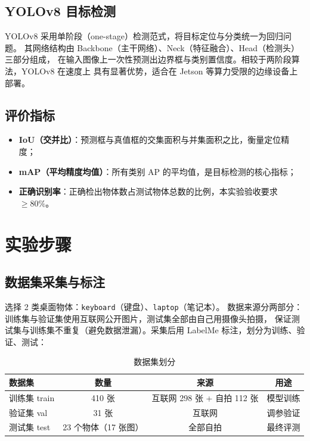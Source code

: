 \documentclass[zihao=-4, a4paper]{ctexart}
\newcommand{\tabhead}[1]{\textbf{\color{white}#1}}
\begin{document}
\subsection{YOLOv8 目标检测}
YOLOv8 采用单阶段（one-stage）检测范式，将目标定位与分类统一为回归问题。
其网络结构由 Backbone（主干网络）、Neck（特征融合）、Head（检测头）三部分组成，
在输入图像上一次性预测出边界框与类别置信度。相较于两阶段算法，YOLOv8 在速度上
具有显著优势，适合在 Jetson 等算力受限的边缘设备上部署。

\subsection{评价指标}
\begin{itemize}[leftmargin=2em]
    \item \textbf{IoU（交并比）}：预测框与真值框的交集面积与并集面积之比，衡量定位精度；
    \item \textbf{mAP（平均精度均值）}：所有类别 AP 的平均值，是目标检测的核心指标；
    \item \textbf{正确识别率}：正确检出物体数占测试物体总数的比例，本实验验收要求 $\geq 80\%$。
\end{itemize}

\section{实验步骤}

\subsection{数据集采集与标注}
选择 2 类桌面物体：\texttt{keyboard}（键盘）、\texttt{laptop}（笔记本）。
数据来源分两部分：训练集与验证集使用互联网公开图片，测试集全部由自己用摄像头拍摄，
保证测试集与训练集不重复（避免数据泄漏）。采集后用 LabelMe 标注，划分为训练、验证、测试：

\begin{table}[H]
    \centering
    \begin{tabular}{@{}lccc@{}}
        \hline
        \rowcolor{primary}
        \tabhead{数据集} & \tabhead{数量} & \tabhead{来源} & \tabhead{用途} \\
        \hline
        训练集 train & 410 张 & 互联网 298 张 + 自拍 112 张 & 模型训练 \\
        验证集 val   & 31 张  & 互联网 & 调参验证 \\
        测试集 test  & 23 个物体（17 张图） & 全部自拍 & 最终评测 \\
        \hline
    \end{tabular}
    \caption{数据集划分}
\end{table}
\end{document}
